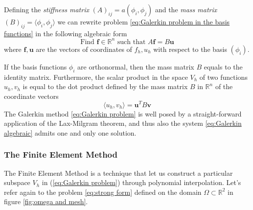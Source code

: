 Defining the \textit{stiffness matrix} $(A)_{ij} = a(\phi_i, \phi_j)$ and the \textit{mass matrix} $(B)_{ij} = \langle \phi_i, \phi_j\rangle$ we can rewrite problem \ref{eq:Galerkin problem in the basis functions} in the following algebraic form
\begin{equation}\label{eq:Galerkin algebraic}
\text{Find }\mathbf f\in\mathbb R^n\text{ such that } A\mathbf f = B \mathbf u
\end{equation}
where $\mathbf f, \mathbf u$ are the vectors of coordinates of $f_h, u_h$ with respect to the basis $(\phi_i)$. 
\vspace{0.5cm}
\begin{remark}
	 If the basis functions $\phi_i$ are orthonormal, then the mass matrix $B$ equals to the identity matrix. Furthermore, the scalar product in the space $V_h$ of two functions $u_h, v_h$ is equal to the dot product defined by the mass matrix $B$ in $\mathbb R^n$ of the coordinate vectors
	\begin{equation}\label{eq:dot product}
	\langle u_h, v_h\rangle = \mathbf u^T B \mathbf v
	\end{equation}
	The Galerkin method \ref{eq:Galerkin problem} is well posed by a straight-forward application of the Lax-Milgram theorem, and thus also the system \ref{eq:Galerkin algebraic} admits one and only one solution.
\end{remark}

 \subsubsection{The Finite Element Method}
  The Finite Element Method is a technique that let us construct a particular subspace $V_h$ in (\ref{eq:Galerkin problem}) through polynomial interpolation. Let's refer again to the problem \ref{eq:strong form} defined on the domain $\Omega\subset\mathbb R^2$ in figure \ref{fig:omega and mesh}. 
